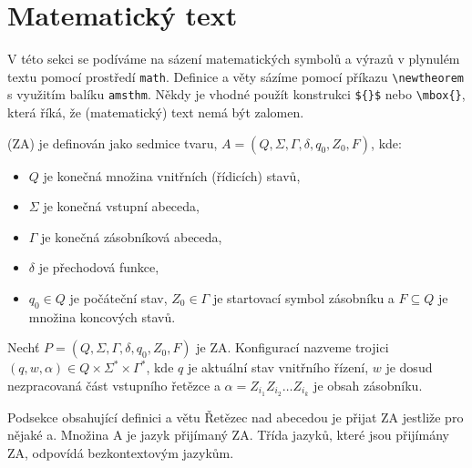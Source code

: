 \documentclass[twocolumn,a4paper,11pt]{article}
\begin{document}
\section{Matematický text}
\label{sec:mattext}
V této sekci se podíváme na sázení matematických symbolů a výrazů v plynulém textu pomocí prostředí \verb|math|.
Definice a věty sázíme pomocí příkazu \verb|\newtheorem| s využitím balíku \verb|amsthm|.
Někdy je vhodné použít konstrukci \verb|${}$| nebo \verb|\mbox{}|, která říká, že (matematický) text nemá být zalomen.
\newtheorem{ZA}{Zásobníkový automat} (ZA) je definován jako sedmice tvaru, $A = (Q, \Sigma, \Gamma, \delta, q_0 , Z_0 , F)$, kde: \begin{itemize} \item $Q$ je konečná množina vnitřních (řídicích) stavů, \item $\Sigma$ je konečná vstupní abeceda, \item $\Gamma$ je konečná zásobníková abeceda, \item $\delta$ je přechodová funkce, \item $q_0 \in Q$ je počáteční stav, $Z_0 \in \Gamma$ je startovací symbol zásobníku a $F \subseteq Q$ je množina koncových stavů.\end{itemize}
Nechť $P = (Q,\Sigma,\Gamma,\delta,q_0,Z_0,F)$ je ZA. Konfigurací nazveme trojici $(q,w,\alpha) \in Q \times \Sigma^*\times \Gamma^*$, kde $q$ je aktuální stav vnitřního řízení, $w$ je dosud nezpracovaná část vstupního řetězce a $\alpha = Z_{i_1}Z_{i_2}\dots Z_{i_k}$ je obsah zásobníku.

Podsekce obsahující definici a větu
Řetězec nad abecedou je přijat ZA jestliže pro nějaké a. Množina A je jazyk přijímaný ZA. Třída jazyků, které jsou přijímány ZA, odpovídá bezkontextovým jazykům.
\end{document}
